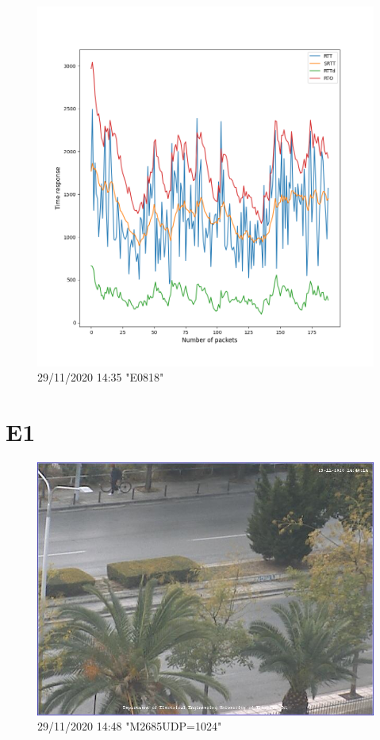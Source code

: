\documentclass[hidelinks, 12pt, a4paper]{article}
\begin{document}
\begin{figure}[h!]
\centering
	\includegraphics[height=.38\textheight, width=\textwidth]{assets/session2/r1.png}
	\caption{29/11/2020 14:35 "E0818"} 
\end{figure}



\section{E1}

\begin{figure}[h!]
\centering
	\includegraphics[height=.38\textheight, width=\textwidth]{assets/session2/image_fix.jpg}
	\caption{29/11/2020 14:48 "M2685UDP=1024"} 
\end{figure}
\end{document}
